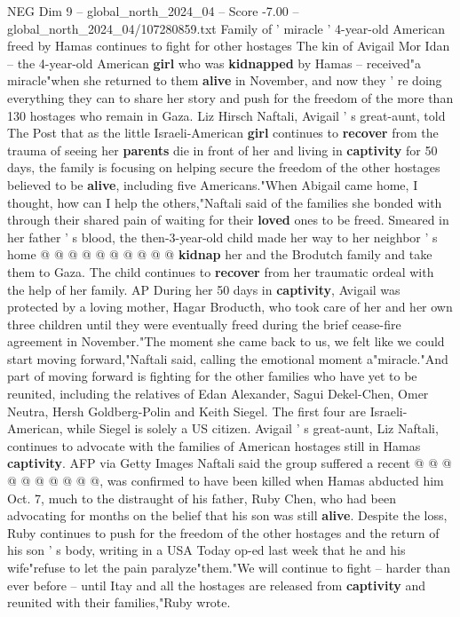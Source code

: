 \begin{textsample}{NEG Dim 9 – global\_north\_2024\_04 – Score -7.00 – global\_north\_2024\_04/107280859.txt}  \label{ex:f9_neg_270}
Family of ' miracle ' 4-year-old American freed by Hamas continues to fight for other hostages The kin of Avigail Mor Idan -- the 4-year-old American \textbf{girl} who was \textbf{kidnapped} by Hamas -- received"a miracle"when she returned to them \textbf{alive} in November, and now they ' re doing everything they can to share her story and push for the freedom of the more than 130 hostages who remain in Gaza.
Liz Hirsch Naftali, Avigail ' s great-aunt, told The Post that as the little Israeli-American \textbf{girl} continues to \textbf{recover} from the trauma of seeing her \textbf{parents} die in front of her and living in \textbf{captivity} for 50 days, the family is focusing on helping secure the freedom of the other hostages believed to be \textbf{alive}, including five Americans."When Abigail came home, I thought, how can I help the others,"Naftali said of the families she bonded with through their shared pain of waiting for their \textbf{loved} ones to be freed.
Smeared in her father ' s blood, the then-3-year-old child made her way to her neighbor ' s home @ @ @ @ @ @ @ @ @ @ \textbf{kidnap} her and the Brodutch family and take them to Gaza.
The child continues to \textbf{recover} from her traumatic ordeal with the help of her family.
AP During her 50 days in \textbf{captivity}, Avigail was protected by a loving mother, Hagar Broducth, who took care of her and her own three children until they were eventually freed during the brief cease-fire agreement in November."The moment she came back to us, we felt like we could start moving forward,"Naftali said, calling the emotional moment a"miracle."And part of moving forward is fighting for the other families who have yet to be reunited, including the relatives of Edan Alexander, Sagui Dekel-Chen, Omer Neutra, Hersh Goldberg-Polin and Keith Siegel.
The first four are Israeli-American, while Siegel is solely a US citizen.
Avigail ' s great-aunt, Liz Naftali, continues to advocate with the families of American hostages still in Hamas \textbf{captivity}.
AFP via Getty Images Naftali said the group suffered a recent @ @ @ @ @ @ @ @ @ @, was confirmed to have been killed when Hamas abducted him Oct. 7, much to the distraught of his father, Ruby Chen, who had been advocating for months on the belief that his son was still \textbf{alive}.
Despite the loss, Ruby continues to push for the freedom of the other hostages and the return of his son ' s body, writing in a USA Today op-ed last week that he and his wife"refuse to let the pain paralyze"them."We will continue to fight -- harder than ever before -- until Itay and all the hostages are released from \textbf{captivity} and reunited with their families,"Ruby wrote.

\end{textsample}
